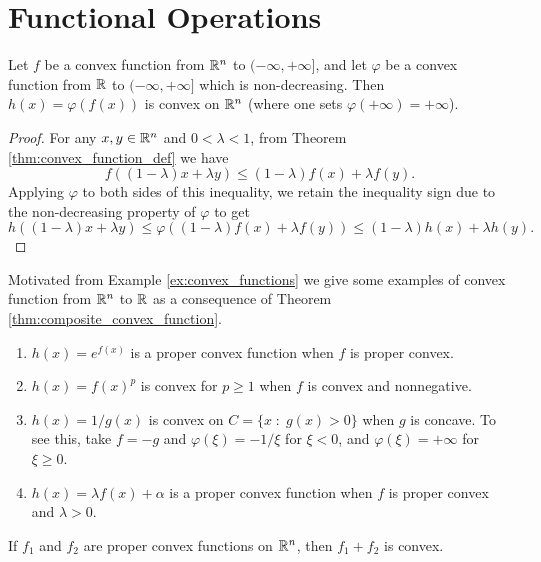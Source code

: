 \documentclass[11pt,a4paper]{article}
\begin{document}
\section{Functional Operations}

\begin{theorem}\label{thm:composite_convex_function}
    Let $f$ be a convex function from $\mathbb{R}^n$ to $(-\infty,+\infty]$, and let $\varphi$ be a convex function from $\mathbb{R}$ to $(-\infty,+\infty]$ which is non-decreasing. Then $h(x) = \varphi(f(x))$ is convex on $\mathbb{R}^n$ (where one sets $\varphi(+\infty) = +\infty$).
\end{theorem}

\begin{proof}
    For any $x,y\in \mathbb{R}^n$ and $0<\lambda<1$, from Theorem \ref{thm:convex_function_def} we have
    \begin{equation*}
        f((1-\lambda)x+\lambda y)\le (1-\lambda)f(x)+\lambda f(y).
    \end{equation*}
    Applying $\varphi$ to both sides of this inequality, we retain the inequality sign due to the non-decreasing property of $\varphi$ to get
    \begin{equation*}
        h((1-\lambda)x+\lambda y)\le \varphi((1-\lambda)f(x)+\lambda f(y)) \le (1-\lambda)h(x)+\lambda h(y).
    \end{equation*}
\end{proof}

\begin{example}
    Motivated from Example \ref{ex:convex_functions} we give some examples of convex function from $\mathbb{R}^n$ to $\mathbb{R}$ as a consequence of Theorem \ref{thm:composite_convex_function}.
    \begin{enumerate}
        \item $h(x) = e^{f(x)}$ is a proper convex function when $f$ is proper convex.
        \item $h(x) = f(x)^p$ is convex for $p\ge 1$ when $f$ is convex and nonnegative.
        \item $h(x) = 1/g(x)$ is convex on $C = \{x\;:\; g(x)>0\}$ when $g$ is concave. To see this, take $f = -g$ and $\varphi(\xi) = -1/\xi$ for $\xi<0$, and $\varphi(\xi)=+\infty$ for $\xi\ge 0$.
        \item $h(x) = \lambda f(x)+\alpha$ is a proper convex function when $f$ is proper convex and $\lambda>0$.
    \end{enumerate}
\end{example}

\begin{theorem}\label{thm:sum_of_convex_functions}
    If $f_1$ and $f_2$ are proper convex functions on $\mathbb{R}^n$, then $f_1+f_2$ is convex.
\end{theorem}
\end{document}
